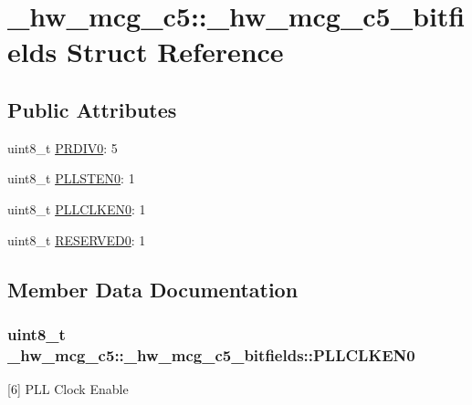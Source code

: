 \hypertarget{struct__hw__mcg__c5_1_1__hw__mcg__c5__bitfields}{}\section{\+\_\+hw\+\_\+mcg\+\_\+c5\+:\+:\+\_\+hw\+\_\+mcg\+\_\+c5\+\_\+bitfields Struct Reference}
\label{struct__hw__mcg__c5_1_1__hw__mcg__c5__bitfields}
\subsection*{Public Attributes}
\begin{DoxyCompactItemize}
\item 
uint8\+\_\+t \hyperlink{struct__hw__mcg__c5_1_1__hw__mcg__c5__bitfields_ac1b19895a9dbd3a00c1f47e602ba0536}{P\+R\+D\+I\+V0}\+: 5
\item 
uint8\+\_\+t \hyperlink{struct__hw__mcg__c5_1_1__hw__mcg__c5__bitfields_a3957a4b3c34034c64784163e7fcc6bb0}{P\+L\+L\+S\+T\+E\+N0}\+: 1
\item 
uint8\+\_\+t \hyperlink{struct__hw__mcg__c5_1_1__hw__mcg__c5__bitfields_a062d6a94a30e28090292f30c25e0acb5}{P\+L\+L\+C\+L\+K\+E\+N0}\+: 1
\item 
uint8\+\_\+t \hyperlink{struct__hw__mcg__c5_1_1__hw__mcg__c5__bitfields_a10d93c6d47987e2d8444c319bb02a63c}{R\+E\+S\+E\+R\+V\+E\+D0}\+: 1
\end{DoxyCompactItemize}


\subsection{Member Data Documentation}
\subsubsection[{\texorpdfstring{P\+L\+L\+C\+L\+K\+E\+N0}{PLLCLKEN0}}]{\setlength{\rightskip}{0pt plus 5cm}uint8\+\_\+t \+\_\+hw\+\_\+mcg\+\_\+c5\+::\+\_\+hw\+\_\+mcg\+\_\+c5\+\_\+bitfields\+::\+P\+L\+L\+C\+L\+K\+E\+N0}\hypertarget{struct__hw__mcg__c5_1_1__hw__mcg__c5__bitfields_a062d6a94a30e28090292f30c25e0acb5}{}\label{struct__hw__mcg__c5_1_1__hw__mcg__c5__bitfields_a062d6a94a30e28090292f30c25e0acb5}
\mbox{[}6\mbox{]} P\+LL Clock Enable 
